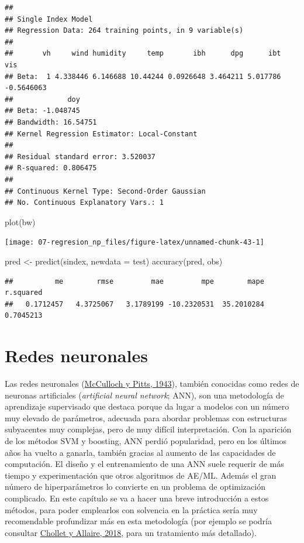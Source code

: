 \documentclass[
  spanish,
]{book}
\newenvironment{Shaded}{\begin{snugshade}}{\end{snugshade}}
\newcommand{\AttributeTok}[1]{\textcolor[rgb]{0.77,0.63,0.00}{#1}}
\newcommand{\FunctionTok}[1]{\textcolor[rgb]{0.00,0.00,0.00}{#1}}
\newcommand{\NormalTok}[1]{#1}
\newcommand{\OtherTok}[1]{\textcolor[rgb]{0.56,0.35,0.01}{#1}}
\theoremstyle{break}
\theoremstyle{definition}
\theoremstyle{definition}
\theoremstyle{definition}
\theoremstyle{definition}
\theoremstyle{remark}
\begin{document}
\begin{verbatim}
## 
## Single Index Model
## Regression Data: 264 training points, in 9 variable(s)
## 
##       vh     wind humidity     temp       ibh      dpg      ibt        vis
## Beta:  1 4.338446 6.146688 10.44244 0.0926648 3.464211 5.017786 -0.5646063
##             doy
## Beta: -1.048745
## Bandwidth: 16.54751
## Kernel Regression Estimator: Local-Constant
## 
## Residual standard error: 3.520037
## R-squared: 0.806475
## 
## Continuous Kernel Type: Second-Order Gaussian
## No. Continuous Explanatory Vars.: 1
\end{verbatim}

\begin{Shaded}
\begin{Highlighting}[]
\FunctionTok{plot}\NormalTok{(bw)}
\end{Highlighting}
\end{Shaded}

\begin{center}\texttt{[image: 07-regresion\_np\_files/figure-latex/unnamed-chunk-43-1]} \end{center}

\begin{Shaded}
\begin{Highlighting}[]
\NormalTok{pred }\OtherTok{\textless{}{-}} \FunctionTok{predict}\NormalTok{(sindex, }\AttributeTok{newdata =}\NormalTok{ test)}
\FunctionTok{accuracy}\NormalTok{(pred, obs)}
\end{Highlighting}
\end{Shaded}

\begin{verbatim}
##          me        rmse         mae         mpe        mape   r.squared 
##   0.1712457   4.3725067   3.1789199 -10.2320531  35.2010284   0.7045213
\end{verbatim}

\hypertarget{neural-nets}{%
\chapter{Redes neuronales}\label{neural-nets}}

Las redes neuronales (\protect\hyperlink{ref-mcculloch1943logical}{McCulloch y Pitts, 1943}), también conocidas como redes de neuronas artificiales (\emph{artificial neural network}; ANN), son una metodología de aprendizaje supervisado que destaca porque da lugar a modelos con un número muy elevado de parámetros, adecuada para abordar problemas con estructuras subyacentes muy complejas, pero de muy difícil interpretación.
Con la aparición de los métodos SVM y boosting, ANN perdió popularidad, pero en los últimos años ha vuelto a ganarla, también gracias al aumento de las capacidades de computación.
El diseño y el entrenamiento de una ANN suele requerir de más tiempo y experimentación que otros algoritmos de AE/ML. Además el gran número de hiperparámetros lo convierte en un problema de optimización complicado.
En este capítulo se va a hacer una breve introducción a estos métodos, para poder emplearlos con solvencia en la práctica sería muy recomendable profundizar más en esta metodología (por ejemplo se podría consultar \protect\hyperlink{ref-chollet2018deep}{Chollet y Allaire, 2018}, para un tratamiento más detallado).
\end{document}
